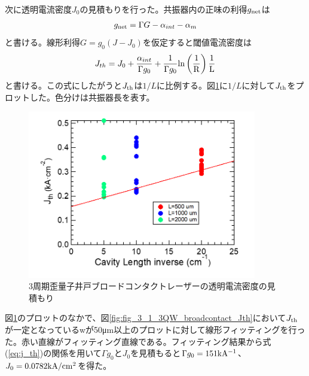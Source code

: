 {次に透明電流密度$J_{0}$の見積もりを行った。共振器内の正味の利得$g_{\rm{net}}$は
\begin{eqnarray}
g_{\rm{net}}=\Gamma G-\alpha_{int}-\alpha_{m}
\label{eq:eta_j0}
\end{eqnarray}
と書ける。線形利得$G=g_{0}(J-J_{0})$を仮定すると閾値電流密度は
\begin{eqnarray}
J_{th}=J_{0}+\dfrac{\alpha_{int}}{\Gamma g_{0}}+\dfrac{1}{\Gamma g_{0}}\rm{ln}\left(\dfrac{1}{R}\right)\dfrac{1}{L}
\label{eq:j_th}
\end{eqnarray}
と書ける。この式にしたがうと$J_{\rm{th}}$は$1/L$に比例する。図\ref{fig:fig_3_1_3QW_broadcontact_j0}に$1/L$に対して$J_{\rm{th}}$をプロットした。色分けは共振器長を表す。
\begin{figure}[h]
	\centering
	\includegraphics[width=10cm]{figure/fig_3_1_3QW_broadcontact_j0.png}
	\caption{3周期歪量子井戸ブロードコンタクトレーザーの透明電流密度の見積もり}
	\label{fig:fig_3_1_3QW_broadcontact_j0}
\end{figure}
図\ref{fig:fig_3_1_3QW_broadcontact_j0}のプロットのなかで、図\ref{fig:fig_3_1_3QW_broadcontact_Jth}において$J_{\rm{th}}$が一定となっているwが50\si{\micro\metre}以上のプロットに対して線形フィッティングを行った。赤い直線がフィッティング直線である。フィッティング結果から式(\ref{eq:j_th})の関係を用いて$\Gamma g_{0}$と$J_{0}$を見積もると$\Gamma g_{0}=151              \rm{ kA^{-1}}$、$J_{0}=0.0782 \rm{kA/cm^{2}}$を得た。


}
